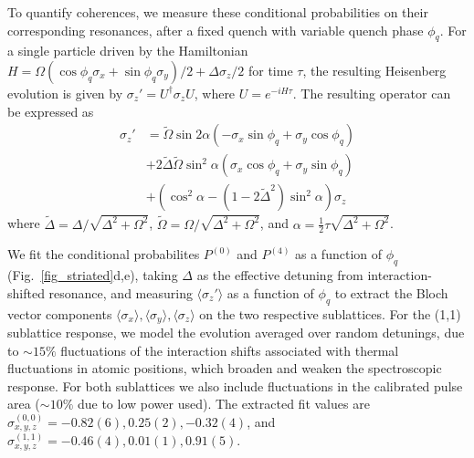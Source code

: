 \documentclass[reprint,twocolumn,secnumarabic,amssymb, aps, prl]{revtex4-1}
\begin{document}
To quantify coherences, we measure these conditional probabilities on their corresponding resonances, after a fixed quench  with variable quench phase $\phi_q$. For a single particle driven by the Hamiltonian $H=\Omega (\cos \phi_q \sigma_x + \sin \phi_q \sigma_y)/2 + \Delta \sigma_z/2$ for time $\tau$, the resulting Heisenberg evolution is given by $\sigma_z' = U^\dagger \sigma_z U$, where $U = e^{-i H \tau}$. The resulting operator can be expressed as 
\begin{align}
    \sigma_z' &= \tilde{\Omega} \sin2\alpha (-\sigma_x \sin \phi_q + \sigma_y \cos \phi_q) \\
    &+ 2\tilde{\Delta}\tilde{\Omega} \sin^2\alpha (\sigma_x \cos\phi_q + \sigma_y \sin \phi_q) \\
    &+ (\cos^2 \alpha - (1 - 2\tilde{\Delta}^2)\sin^2 \alpha) \sigma_z
\end{align}
where $\tilde{\Delta} = \Delta / \sqrt{\Delta^2 + \Omega^2}$, $\tilde{\Omega} = \Omega / \sqrt{\Delta^2 + \Omega^2}$, and $\alpha = \frac{1}{2}\tau \sqrt{\Delta^2+\Omega^2}$.

We fit the conditional probabilites $P^{(0)}$ and $P^{(4)}$ as a function of $\phi_q$ (Fig.~\ref{fig_striated}d,e), taking $\Delta$ as the effective detuning from interaction-shifted resonance, and measuring $\langle \sigma_z' \rangle$ as a function of $\phi_q$ to extract the Bloch vector components $\langle \sigma_x \rangle, \langle \sigma_y \rangle, \langle \sigma_z \rangle$ on the two respective sublattices. For the (1,1) sublattice response, we model the evolution averaged over random detunings, due to $\sim 15\%$ fluctuations of the interaction shifts associated with thermal fluctuations in atomic positions, which broaden and weaken the spectroscopic response. For both sublattices we also include fluctuations in the calibrated pulse area ($\sim 10\%$ due to low power used). The extracted fit values are $\sigma_{x,y,z}^{(0,0)} = -0.82(6), 0.25(2), -0.32(4)$, and $\sigma_{x,y,z}^{(1,1)} = -0.46(4), 0.01(1), 0.91(5)$.\\


%
%
\end{document}
